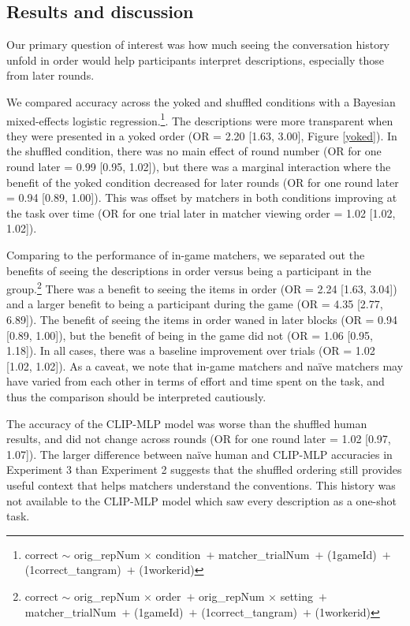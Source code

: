 \documentclass[10pt, letterpaper]{article}
\begin{document}
\subsection{Results and discussion}\label{results-and-discussion-1}

Our primary question of interest was how much seeing the conversation
history unfold in order would help participants interpret descriptions,
especially those from later rounds.

We compared accuracy across the yoked and shuffled conditions with a
Bayesian mixed-effects logistic regression.\footnote{correct \({\sim}\)
  orig\_repNum \({\times}\) condition~\({+}\) matcher\_trialNum~\({+}\)
  (1\textbar gameId)~\({+}\) (1\textbar correct\_tangram)~\({+}\)
  (1\textbar workerid)}. The descriptions were more transparent when
they were presented in a yoked order (OR = 2.20 {[}1.63, 3.00{]}, Figure
\ref{yoked}). In the shuffled condition, there was no main effect of
round number (OR for one round later = 0.99 {[}0.95, 1.02{]}), but there
was a marginal interaction where the benefit of the yoked condition
decreased for later rounds (OR for one round later = 0.94 {[}0.89,
1.00{]}). This was offset by matchers in both conditions improving at
the task over time (OR for one trial later in matcher viewing order =
1.02 {[}1.02, 1.02{]}).

Comparing to the performance of in-game matchers, we separated out the
benefits of seeing the descriptions in order versus being a participant
in the group.\footnote{correct \({\sim}\) orig\_repNum \({\times}\)
  order~\({+}\) orig\_repNum \({\times}\) setting~\({+}\)
  matcher\_trialNum~\({+}\) (1\textbar gameId)~\({+}\)
  (1\textbar correct\_tangram)~\({+}\) (1\textbar workerid)} There was a
benefit to seeing the items in order (OR = 2.24 {[}1.63, 3.04{]}) and a
larger benefit to being a participant during the game (OR = 4.35
{[}2.77, 6.89{]}). The benefit of seeing the items in order waned in
later blocks (OR = 0.94 {[}0.89, 1.00{]}), but the benefit of being in
the game did not (OR = 1.06 {[}0.95, 1.18{]}). In all cases, there was a
baseline improvement over trials (OR = 1.02 {[}1.02, 1.02{]}). As a
caveat, we note that in-game matchers and naïve matchers may have varied
from each other in terms of effort and time spent on the task, and thus
the comparison should be interpreted cautiously.

The accuracy of the CLIP-MLP model was worse than the shuffled human
results, and did not change across rounds (OR for one round later = 1.02
{[}0.97, 1.07{]}). The larger difference between naïve human and
CLIP-MLP accuracies in Experiment 3 than Experiment 2 suggests that the
shuffled ordering still provides useful context that helps matchers
understand the conventions. This history was not available to the
CLIP-MLP model which saw every description as a one-shot task.
\end{document}
